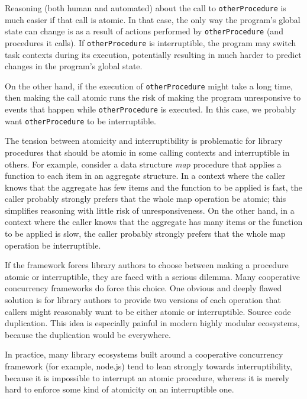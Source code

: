 \documentclass[9pt,preprint]{sigplanconf}
\begin{document}
Reasoning (both human and automated) about the call to \texttt{otherProcedure} is much easier if that call is atomic.
In that case, the only way the program's global state can change is as a result of actions performed by \texttt{otherProcedure} (and procedures it calls).
If \texttt{otherProcedure} is interruptible, the program may switch task contexts during its execution, potentially resulting in much harder to predict changes in the program's global state.

On the other hand, if the execution of \texttt{otherProcedure} might take a long time\footnotemark{}, then making the call atomic runs the risk of making the program unresponsive to events that happen while \texttt{otherProcedure} is executed.
In this case, we probably want \texttt{otherProcedure} to be interruptible.


The tension between atomicity and interruptibility is problematic for library procedures that should be atomic in some calling contexts and interruptible in others.
For example, consider a data structure \emph{map} procedure that applies a function to each item in an aggregate structure.
In a context where the caller knows that the aggregate has few items and the function to be applied is fast, the caller probably strongly prefers that the whole map operation be atomic; this simplifies reasoning with little risk of unresponsiveness.
On the other hand, in a context where the caller knows that the aggregate has many items or the function to be applied is slow, the caller probably strongly prefers that the whole map operation be interruptible.

If the framework forces library authors to choose between making a procedure atomic or interruptible, they are faced with a serious dilemma.
Many cooperative concurrency frameworks do force this choice.
One obvious and deeply flawed solution is for library authors to provide two versions of each operation that callers might reasonably want to be either atomic or interruptible.
Source code duplication.
This idea is especially painful in modern highly modular ecosystems, because the duplication would be everywhere.

In practice, many library ecosystems built around a cooperative concurrency framework (for example, node.js) tend to lean strongly towards interruptibility, because it is impossible to interrupt an atomic procedure, whereas it is merely hard to enforce some kind of atomicity on an interruptible one.
\end{document}
